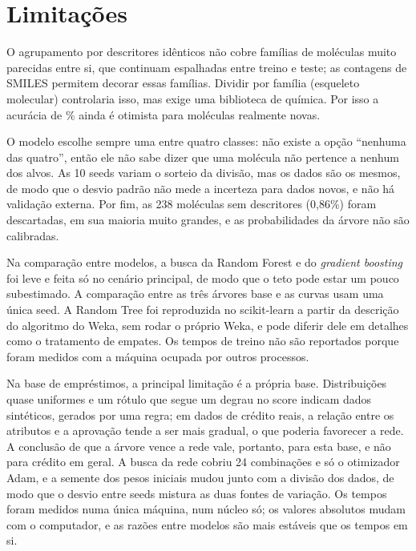 \section{Limitações}\label{sec:limitacoes}

O agrupamento por descritores idênticos não cobre famílias de moléculas muito parecidas entre si, que continuam espalhadas entre treino e teste; as contagens de SMILES permitem decorar essas famílias. Dividir por família (esqueleto molecular) controlaria isso, mas exige uma biblioteca de química. Por isso a acurácia de \accGrupAmbos\% ainda é otimista para moléculas realmente novas.

O modelo escolhe sempre uma entre quatro classes: não existe a opção ``nenhuma das quatro'', então ele não sabe dizer que uma molécula não pertence a nenhum dos alvos. As 10 seeds variam o sorteio da divisão, mas os dados são os mesmos, de modo que o desvio padrão não mede a incerteza para dados novos, e não há validação externa. Por fim, as 238 moléculas sem descritores (0,86\%) foram descartadas, em sua maioria muito grandes, e as probabilidades da árvore não são calibradas.

Na comparação entre modelos, a busca da Random Forest e do \emph{gradient boosting} foi leve e feita só no cenário principal, de modo que o teto pode estar um pouco subestimado. A comparação entre as três árvores base e as curvas usam uma única seed. A Random Tree foi reproduzida no scikit-learn a partir da descrição do algoritmo do Weka, sem rodar o próprio Weka, e pode diferir dele em detalhes como o tratamento de empates. Os tempos de treino não são reportados porque foram medidos com a máquina ocupada por outros processos.

Na base de empréstimos, a principal limitação é a própria base. Distribuições quase uniformes e um rótulo que segue um degrau no score indicam dados sintéticos, gerados por uma regra; em dados de crédito reais, a relação entre os atributos e a aprovação tende a ser mais gradual, o que poderia favorecer a rede. A conclusão de que a árvore vence a rede vale, portanto, para esta base, e não para crédito em geral. A busca da rede cobriu 24 combinações e só o otimizador Adam, e a semente dos pesos iniciais mudou junto com a divisão dos dados, de modo que o desvio entre seeds mistura as duas fontes de variação. Os tempos foram medidos numa única máquina, num núcleo só; os valores absolutos mudam com o computador, e as razões entre modelos são mais estáveis que os tempos em si.

